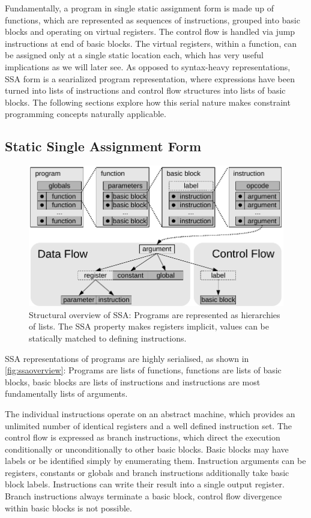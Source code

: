     Fundamentally, a program in single static assignment form is made up of
    functions, which are represented as sequences of instructions, grouped into
    basic blocks and operating on virtual registers.
    The control flow is handled via jump instructions at end of basic blocks.
    The virtual registers, within a function, can be assigned only at a single
    static location each, which has very useful implications as we will later
    see.
    As opposed to syntax-heavy representations, SSA form is a searialized
    program representation, where expressions have been turned into lists of
    instructions and control flow structures into lists of basic blocks.
    The following sections explore how this serial nature makes constraint
    programming concepts naturally applicable.

\subsection{Static Single Assignment Form}

\begin{figure}[t]
\centering
\includegraphics{figures/ssaoverview}
\caption{Structural overview of SSA: Programs are represented as hierarchies of
    lists. The SSA property makes registers implicit, values can be statically
    matched to defining instructions.}
\label{fig:ssaoverview}
\end{figure}

    SSA representations of programs are highly serialised, as shown in
    \autoref{fig:ssaoverview}:
    Programs are lists of functions, functions are lists of basic blocks,
    basic blocks are lists of instructions and instructions are most
    fundamentally lists of arguments.

    The individual instructions operate on an abstract machine, which provides
    an unlimited number of identical registers and a well defined instruction
    set.
    The control flow is expressed as branch instructions, which direct the
    execution conditionally or unconditionally to other basic blocks.
    Basic blocks may have labels or be identified simply by enumerating them.
    Instruction arguments can be registers, constants or globals and branch
    instructions additionally take basic block labels.
    Instructions can write their result into a single output register.
    Branch instructions always terminate a basic block, control flow divergence
    within basic blocks is not possible.

